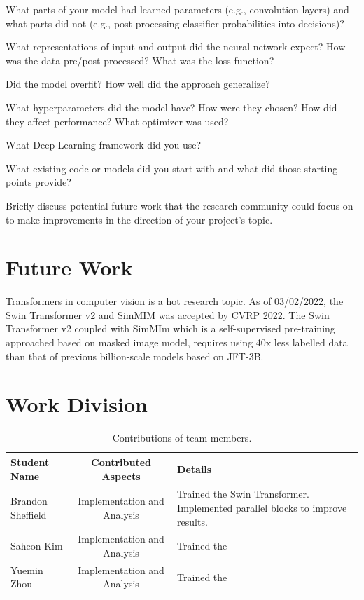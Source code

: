 \documentclass[10pt,twocolumn,letterpaper]{article}
\begin{document}
What parts of your model had learned parameters (e.g., convolution layers) and what parts did not (e.g., post-processing classifier probabilities into decisions)? 

What representations of input and output did the neural network expect? How was the data pre/post-processed?
What was the loss function? 

Did the model overfit? How well did the approach generalize? 

What hyperparameters did the model have? How were they chosen? How did they affect performance? What optimizer was used? 

What Deep Learning framework did you use? 

What existing code or models did you start with and what did those starting points provide? 

Briefly discuss potential future work that the research community could focus on to make improvements in the direction of your project's topic.

\section{Future Work}

Transformers in computer vision is a hot research topic. As of 03/02/2022, the Swin Transformer v2\cite{liu2021swinV2} and SimMIM\cite{xie2021simmim} was accepted by CVRP 2022. The Swin Transformer v2 coupled with SimMIm which is a self-supervised pre-training approached based on masked image model, requires using 40x less labelled data than that of previous billion-scale models based on JFT-3B\cite{dai2021coatnet}\cite{riquelme2021scaling}\cite{https://doi.org/10.48550/arxiv.2106.04560}.


\section{Work Division}

\begin{table}
\begin{center}
\begin{tabular}{|l|c|p{8cm}|}
\hline
Student Name & Contributed Aspects & Details \\
\hline\hline
Brandon Sheffield & Implementation and Analysis & Trained the Swin Transformer. Implemented parallel blocks to improve results. \\
Saheon Kim & Implementation and Analysis & Trained the  \\
Yuemin Zhou & Implementation and Analysis & Trained the \\
\hline
\end{tabular}
\end{center}
\caption{Contributions of team members.}
\label{tab:contributions}
\end{table}
\end{document}
